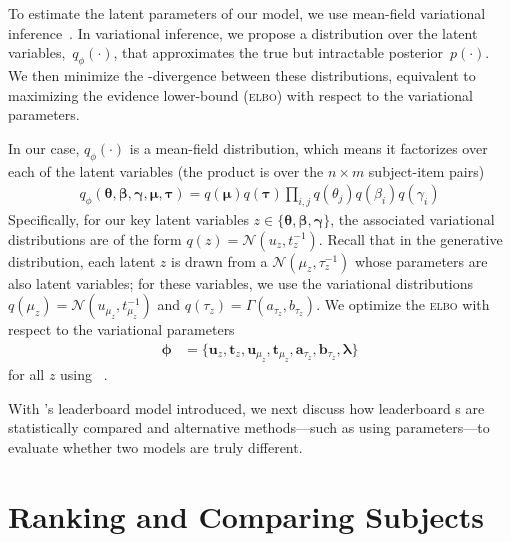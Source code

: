 To estimate the latent parameters of our model, we use mean-field
variational inference~\cite{jordan-99}.
In variational inference, we propose a distribution over the latent
variables,~$q_\phi(\cdot)$, that approximates the true but intractable
posterior~$p(\cdot)$.
We then minimize the -divergence between these distributions,
equivalent to maximizing the evidence lower-bound (\textsc{elbo}) with
respect to the variational parameters.

In our case, $q_\phi(\cdot)$ is a mean-field distribution, which means it
factorizes over each of the latent variables (the product is over the
$n \times m$ subject-item pairs)
\begin{align*}
  q_\phi(\bm{\theta}, \bm{\beta}, \bm{\gamma}, \bm{\mu}, \bm{\tau}) = q(\bm{\mu})q(\bm{\tau})\prod_{i,j} q(\theta_j)q(\beta_i)q(\gamma_i)
\end{align*}
Specifically, for our key latent variables $z \in \{\bm{\theta}, \bm{\beta}, \bm{\gamma}\}$, the associated variational distributions are of the form $q(z) = \mathcal{N}(u_z, t_z^{-1})$.
Recall that in the generative distribution, each latent $z$ is drawn from a $\mathcal{N}(\mu_z, \tau_z^{-1})$ whose parameters are also latent variables; for these variables, we use the variational distributions $q(\mu_z) = \mathcal{N}(u_{\mu_z}, t_{\mu_z}^{-1})$ and $q(\tau_z) = \Gamma(a_{\tau_z}, b_{\tau_z})$. We optimize the \textsc{elbo} with respect to the variational parameters
\begin{align*}
  \bm{\phi} & =\{\bm{u}_z,\bm{t}_z,\bm{u}_{\mu_z},\bm{t}_{\mu_z},\bm{a}_{\tau_z},\bm{b}_{\tau_z},\bm{\lambda}\}
\end{align*}
for all $z$ using ~\citep{Kingma2014AdamAM}.

With \name{}'s leaderboard \irt{} model introduced, we next discuss
how leaderboard \subj{}s are statistically compared and alternative
methods---such as using \irt{} parameters---to evaluate whether two
models are truly different.
\section{Ranking and Comparing Subjects}
\label{ch:isicle:compare}


